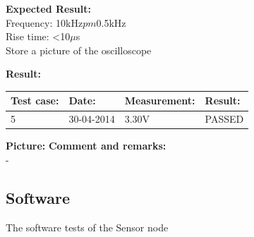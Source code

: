 \begin{figure}[H]
	\centering

\end{figure}

\textbf{Expected Result:}\\
Frequency: 10kHz$pm$0.5kHz\\
Rise time: <10$\mu$s\\
Store a picture of the oscilloscope


\textbf{Result:}
\begin{table}[H]
\centering
\begin{tabular}{|p{2cm}|p{2cm}|p{3cm}|p{2cm}|}\hline
\textbf{Test case:} & \textbf{Date:} & \textbf{Measurement:} & \textbf{Result:} \\ \hline
5 & 30-04-2014 & 3.30V & PASSED \\ \hline
\end{tabular}
\end{table}
\textbf{Picture:}
\textbf{Comment and remarks:}\\
-\\
\subsection{Software}
The software tests of the Sensor node
